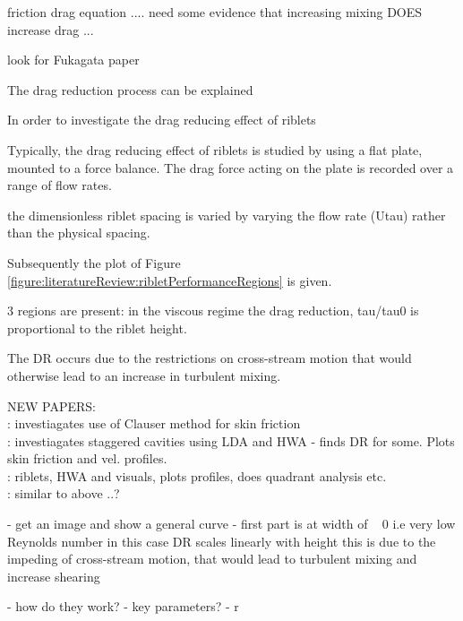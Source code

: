 \documentclass[12pt,oneside,a4paper]{article}
\begin{document}
friction drag equation .... need some evidence that increasing mixing DOES increase drag ... 

look for Fukagata paper





The drag reduction process can be explained 


In order to investigate the drag reducing effect of riblets 

Typically, the drag reducing effect of riblets is studied by using a flat plate, mounted to a force balance. The drag force acting on the plate is recorded over a range of flow rates. 

the dimensionless riblet spacing is varied by varying the flow rate (Utau) rather than the physical spacing. 

Subsequently the plot of Figure \ref{figure:literatureReview:ribletPerformanceRegions} is given.

3 regions are present:
in the viscous regime the drag reduction, tau/tau0 is proportional to the riblet height. 

The DR occurs due to the restrictions on cross-stream motion that would otherwise lead to an increase in turbulent mixing. 

\vspace{5cm}
NEW PAPERS:\\
\citep{wei2005}: 	investiagates use of Clauser method for skin friction\\
\citep{atkin2016}:	investiagates staggered cavities using LDA and HWA - finds DR for some. Plots skin friction and vel. profiles.\\
\citep{tang1993}:	riblets, HWA and visuals, plots profiles, does quadrant analysis etc.\\
\citep{choi1989}: similar to above ..?\\

\vspace{5cm}



\newpage






- get an image and show a general curve
		-	first part is at width of ~ 0 i.e very low Reynolds number
						in this case DR scales linearly with height
						this is due to the impeding of cross-stream motion, that would lead to turbulent mixing and increase shearing  

- how do they work?
- key parameters?
- r
 
\end{document}
